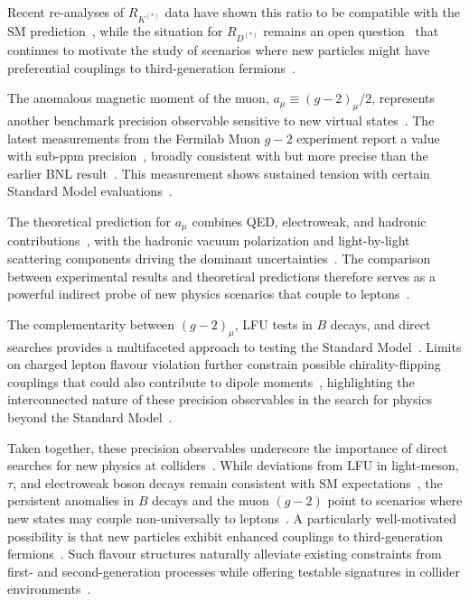 Recent re-analyses of $R_{K^{(*)}}$ data have shown this ratio to be compatible with the SM prediction~\parencite{LHCb:2022qnv,LHCb:2022zom,Greljo:2022jac,Ciuchini:2022wbq}, while the situation for $R_{D^{(*)}}$ remains an open question~\cite{Amhis_2021} that continues to motivate the study of scenarios where new particles might have preferential couplings to third-generation fermions~\cite{Greljo:2018tuh,King:2021jeo,Cornella:2019hct}.

The anomalous magnetic moment of the muon, $a_\mu \equiv (g-2)_\mu/2$, represents another benchmark precision observable sensitive to new virtual states~\cite{Aoyama:2020ynm}. The latest measurements from the Fermilab Muon $g-2$ experiment report a value with sub-ppm precision~\parencite{Abi_2021}, broadly consistent with but more precise than the earlier BNL result~\cite{Muong-2:2006rrc}. This measurement shows sustained tension with certain Standard Model evaluations~\cite{Aoyama:2020ynm}.

The theoretical prediction for $a_\mu$ combines QED, electroweak, and hadronic contributions~\cite{Aoyama:2020ynm}, with the hadronic vacuum polarization and light-by-light scattering components driving the dominant uncertainties~\parencite{arxiv.1311.2198,1674-1137-40-10-100001}. The comparison between experimental results and theoretical predictions therefore serves as a powerful indirect probe of new physics scenarios that couple to leptons~\cite{Aoyama:2020ynm}.

The complementarity between $(g-2)_\mu$, LFU tests in $B$ decays, and direct searches provides a multifaceted approach to testing the Standard Model~\cite{Ciuchini:2022wbq,Greljo:2022jac}. Limits on charged lepton flavour violation further constrain possible chirality-flipping couplings that could also contribute to dipole moments~\cite{Blankenburg:2012nx,Angelescu:2018tyl}, highlighting the interconnected nature of these precision observables in the search for physics beyond the Standard Model~\cite{Dorsner:2016wpm}.

Taken together, these precision observables underscore the importance of direct searches for new physics at colliders~\cite{CMS:2020wzx,ATLAS:2019qpq}. While deviations from LFU in light-meson, $\tau$, and electroweak boson decays remain consistent with SM expectations~\cite{1674-1137-40-10-100001,LEPEW:2006}, the persistent anomalies in $B$ decays and the muon $(g-2)$ point to scenarios where new states may couple non-universally to leptons~\cite{Buttazzo:2017ixm,Aoyama:2020ynm}. A particularly well-motivated possibility is that new particles exhibit enhanced couplings to third-generation fermions~\cite{Greljo:2018tuh,DiLuzio:2018zxy}. Such flavour structures naturally alleviate existing constraints from first- and second-generation processes while offering testable signatures in collider environments~\cite{Angelescu:2021lln,Cornella:2021sby}. 

